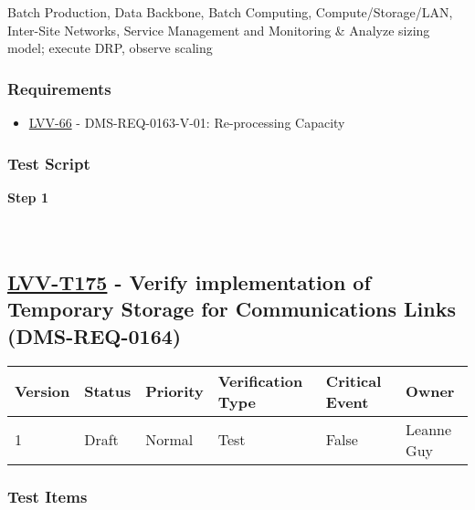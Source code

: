 Batch Production, Data Backbone, Batch Computing, Compute/Storage/LAN,
Inter-Site Networks, Service Management and Monitoring \& Analyze sizing
model; execute DRP, observe scaling

\hypertarget{requirements-151}{%
\subsubsection{Requirements}\label{requirements-151}}

\begin{itemize}
\tightlist
\item
  \href{https://jira.lsstcorp.org/browse/LVV-66}{LVV-66} -
  DMS-REQ-0163-V-01: Re-processing Capacity
\end{itemize}

\hypertarget{test-script-151}{%
\subsubsection{Test Script}\label{test-script-151}}

\textbf{Step 1}\\
~\\
~\\

\hypertarget{lvv-t175---verify-implementation-of-temporary-storage-for-communications-links-dms-req-0164}{%
\subsection{\texorpdfstring{\href{https://jira.lsstcorp.org/secure/Tests.jspa\#/testCase/LVV-T175}{LVV-T175}
- Verify implementation of Temporary Storage for Communications Links
(DMS-REQ-0164)}{LVV-T175 - Verify implementation of Temporary Storage for Communications Links (DMS-REQ-0164)}}\label{lvv-t175---verify-implementation-of-temporary-storage-for-communications-links-dms-req-0164}}

\begin{longtable}[]{@{}llllll@{}}
\toprule
Version & Status & Priority & Verification Type & Critical Event &
Owner\tabularnewline
\midrule
\endhead
1 & Draft & Normal & Test & False & Leanne Guy\tabularnewline
\bottomrule
\end{longtable}

\hypertarget{test-items-151}{%
\subsubsection{Test Items}\label{test-items-151}}

